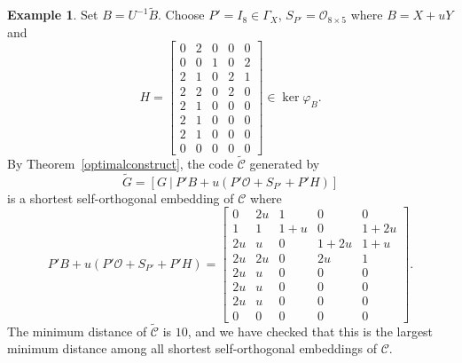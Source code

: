 \documentclass{article}
\theoremstyle{definition}
\newtheorem{example}{Example}[section]
\theoremstyle{remark}
\begin{document}
\begin{example}
    Set $B=U^{-1}\tilde{B}$. Choose $P'=I_8\in \Gamma_X$, $S_{P'}=\mathcal{O}_{8\times 5}$ where $B=X+uY$ and
    \[
    H=\begin{bmatrix}
        0 & 2 & 0 & 0 & 0\\
        0 & 0 & 1 & 0 & 2\\
        2 & 1 & 0 & 2 & 1\\
        2 & 2 & 0 & 2 & 0\\
        2 & 1 & 0 & 0 & 0\\
        2 & 1 & 0 & 0 & 0\\
        2 & 1 & 0 & 0 & 0\\
        0 & 0 & 0 & 0 & 0
    \end{bmatrix}\in \ker\varphi_{B}.
    \]
    By Theorem~\ref{optimalconstruct}, the code $\tilde{\mathcal{C}}$ generated by
    \[
    \tilde{G}=[G~|~P'B+u(P'\mathcal{O}+S_{P'}+P'H)]
    \]
    is a shortest self-orthogonal embedding of $\mathcal{C}$
    where
    \[
    P'B+u(P'\mathcal{O}+S_{P'}+P'H)=\begin{bmatrix}
        0 & 2u & 1 & 0 & 0\\
        1 & 1 & 1+u & 0 & 1+2u\\
        2u & u & 0 & 1+2u & 1+u\\
        2u & 2u & 0 & 2u & 1\\
        2u & u & 0 & 0 & 0\\
        2u & u & 0 & 0 & 0\\
        2u & u & 0 & 0 & 0\\
        0 & 0 & 0 & 0 & 0
    \end{bmatrix}.
    \]
    The minimum distance of $\tilde{\mathcal{C}}$ is $10$, and we have checked that this is the largest minimum distance among all shortest self-orthogonal embeddings of $\mathcal{C}$.
\end{example}
\end{document}
